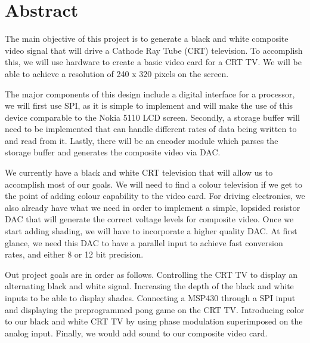 \section*{Abstract}

The main objective of this project is to generate a black and white composite
video signal that will drive a Cathode Ray Tube (CRT) television. To accomplish
this, we will use hardware to create a basic video card for a CRT TV. We will be
able to achieve a resolution of 240 x 320 pixels on the screen.

The major components of this design include a digital interface for a processor,
we will first use SPI, as it is simple to implement and will make the use of
this device comparable to the Nokia 5110 LCD screen. Secondly, a storage buffer
will need to be implemented that can handle different rates of data being
written to and read from it. Lastly, there will be an encoder module which
parses the storage buffer and generates the composite video via DAC.

We currently have a black and white CRT television that will allow us to
accomplish most of our goals. We will need to find a colour television if we get
to the point of adding colour capability to the video card. For driving
electronics, we also already have what we need in order to implement a simple,
lopsided resistor DAC that will generate the correct voltage levels for
composite video. Once we start adding shading, we will have to incorporate a
higher quality DAC. At first glance, we need this DAC to have a parallel input
to achieve fast conversion rates, and either 8 or 12 bit precision. 

Out project goals are in order as follows. Controlling the CRT TV to display an
alternating black and white signal. Increasing the depth of the black and white
inputs to be able to display shades. Connecting a MSP430 through a SPI input and
displaying the preprogrammed pong game on the CRT TV. Introducing color to our
black and white CRT TV by using phase modulation superimposed on the analog
input. Finally, we would add sound to our composite video card.
